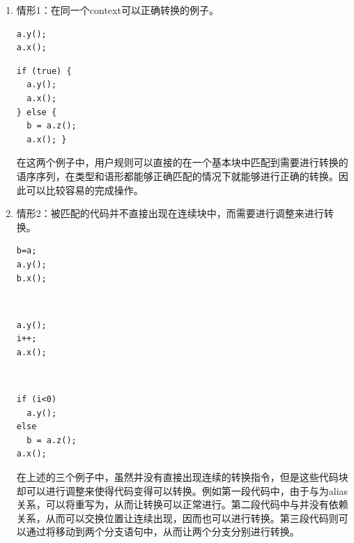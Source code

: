\begin{enumerate}
\item 情形1：在同一个context可以正确转换的例子。
\begin{center}
\begin{smpage}{0.3\columnwidth}
\begin{lstlisting}[style=patl,frame=none, numbers=none]
a.y();
a.x();
\end{lstlisting}
\end{smpage}
\begin{smpage}{0.6\columnwidth}
\begin{lstlisting}[style=patl,frame=none, numbers=none]
if (true) {
  a.y();
  a.x();
} else {
  b = a.z();
  a.x(); }
\end{lstlisting}
\end{smpage}
\end{center}
在这两个例子中，用户规则可以直接的在一个基本块中匹配到需要进行转换的语序序列，在类型和语形都能够正确匹配的情况下就能够进行正确的转换。因此可以比较容易的完成操作。
\item 情形2：被匹配的代码并不直接出现在连续块中，而需要进行调整来进行转换。
\begin{center}
\begin{smpage}{0.2\columnwidth}
\begin{lstlisting}[style=patl,frame=none, numbers=none]
b=a;
a.y();
b.x();
\end{lstlisting}
\end{smpage}
~
\begin{smpage}{0.2\columnwidth}
\begin{lstlisting}[style=patl,frame=none, numbers=none]
a.y();
i++;
a.x();
\end{lstlisting}
\end{smpage}
~
\begin{smpage}{0.48\columnwidth}
\begin{lstlisting}[style=patl,frame=none, numbers=none]
if (i<0) 
  a.y();
else 
  b = a.z();
a.x();
\end{lstlisting}
\end{smpage}
\end{center}
在上述的三个例子中，虽然并没有直接出现连续的转换指令，但是这些代码块却可以进行调整来使得代码变得可以转换。例如第一段代码中，由于与为alias关系，可以将重写为，从而让转换可以正常进行。第二段代码中与并没有依赖关系，从而可以交换位置让连续出现，因而也可以进行转换。第三段代码则可以通过将移动到两个分支语句中，从而让两个分支分别进行转换。

\end{enumerate}
